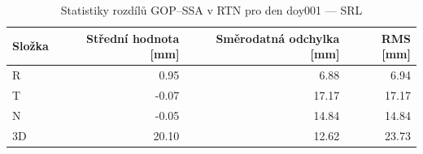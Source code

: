 \begin{table}[H]
\centering
\caption{Statistiky rozdílů GOP–SSA v RTN pro den doy001 — SRL}
\label{tab:gop_vs_ssa_srl_doy001_day_stats}
\begin{tabular}{lrrr}
\toprule
Složka & Střední hodnota [mm] & Směrodatná odchylka [mm] & RMS [mm] \\
\midrule
R & 0.95 & 6.88 & 6.94 \\
T & -0.07 & 17.17 & 17.17 \\
N & -0.05 & 14.84 & 14.84 \\
3D & 20.10 & 12.62 & 23.73 \\
\bottomrule
\end{tabular}
\end{table}
